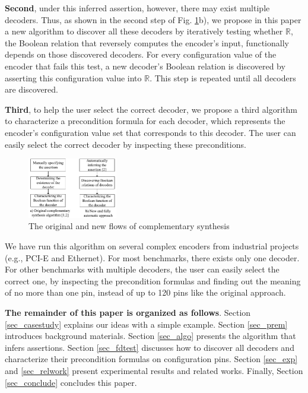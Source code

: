 \documentclass[journal]{IEEEtran}
\begin{document}
\textbf{Second},
under this inferred assertion,
however,
there may exist multiple decoders.
Thus,
as shown in the second step of Fig. \ref{flow}b),
we propose in this paper a new algorithm to discover all these decoders by iteratively testing whether $\mathbb{R}$,
the Boolean relation that reversely computes the encoder's input,
functionally depends on those discovered decoders.
For every configuration value of the encoder that fails this test,
a new decoder's Boolean relation is discovered by asserting this configuration value into $\mathbb{R}$.
This step is repeated until all decoders are discovered.

\textbf{Third},
to help the user select the correct decoder,
we propose a third algorithm to characterize a precondition formula for each decoder,
which represents the encoder's configuration value set that corresponds to this decoder.
The user can easily select the correct decoder by inspecting these preconditions.

\begin{figure}[t]
\begin{center}
\includegraphics[width=0.35\textwidth]{flow}
\end{center}
\caption{The original and new flows of complementary synthesis}
  \label{flow}
\end{figure}


We have run this algorithm on several complex encoders from industrial projects
(e.g.,
PCI-E\cite{PCIESPEC} and Ethernet\cite{IEEE80232002}).
For most benchmarks,
there exists only one decoder.
For other benchmarks with multiple decoders,
the user can easily select the correct one,
by inspecting the precondition formulas
and finding out the meaning of no more than one pin,
instead of up to 120 pins like the original approach\cite{ShengYuShen:iccad09}.


\textbf{The remainder of this paper is organized as follows}.
Section \ref{sec_casestudy} explains our ideas with a simple example.
Section \ref{sec_prem} introduces background materials.
Section \ref{sec_algo} presents the algorithm that infers assertions.
Section \ref{sec_fdtest} discusses how to discover all decoders and characterize their precondition formulas on configuration pins.
Section \ref{sec_exp} and \ref{sec_relwork} present experimental results and related works.
Finally,
Section \ref{sec_conclude} concludes this paper.
\end{document}
